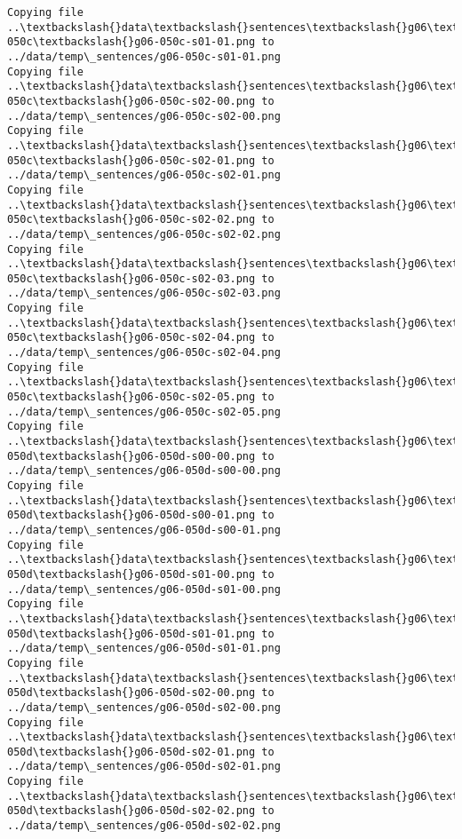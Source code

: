 \documentclass[11pt]{article}
\begin{document}
\begin{Verbatim}[commandchars=\\\{\}]
Copying file ..\textbackslash{}data\textbackslash{}sentences\textbackslash{}g06\textbackslash{}g06-050c\textbackslash{}g06-050c-s01-01.png to
../data/temp\_sentences/g06-050c-s01-01.png
Copying file ..\textbackslash{}data\textbackslash{}sentences\textbackslash{}g06\textbackslash{}g06-050c\textbackslash{}g06-050c-s02-00.png to
../data/temp\_sentences/g06-050c-s02-00.png
Copying file ..\textbackslash{}data\textbackslash{}sentences\textbackslash{}g06\textbackslash{}g06-050c\textbackslash{}g06-050c-s02-01.png to
../data/temp\_sentences/g06-050c-s02-01.png
Copying file ..\textbackslash{}data\textbackslash{}sentences\textbackslash{}g06\textbackslash{}g06-050c\textbackslash{}g06-050c-s02-02.png to
../data/temp\_sentences/g06-050c-s02-02.png
Copying file ..\textbackslash{}data\textbackslash{}sentences\textbackslash{}g06\textbackslash{}g06-050c\textbackslash{}g06-050c-s02-03.png to
../data/temp\_sentences/g06-050c-s02-03.png
Copying file ..\textbackslash{}data\textbackslash{}sentences\textbackslash{}g06\textbackslash{}g06-050c\textbackslash{}g06-050c-s02-04.png to
../data/temp\_sentences/g06-050c-s02-04.png
Copying file ..\textbackslash{}data\textbackslash{}sentences\textbackslash{}g06\textbackslash{}g06-050c\textbackslash{}g06-050c-s02-05.png to
../data/temp\_sentences/g06-050c-s02-05.png
Copying file ..\textbackslash{}data\textbackslash{}sentences\textbackslash{}g06\textbackslash{}g06-050d\textbackslash{}g06-050d-s00-00.png to
../data/temp\_sentences/g06-050d-s00-00.png
Copying file ..\textbackslash{}data\textbackslash{}sentences\textbackslash{}g06\textbackslash{}g06-050d\textbackslash{}g06-050d-s00-01.png to
../data/temp\_sentences/g06-050d-s00-01.png
Copying file ..\textbackslash{}data\textbackslash{}sentences\textbackslash{}g06\textbackslash{}g06-050d\textbackslash{}g06-050d-s01-00.png to
../data/temp\_sentences/g06-050d-s01-00.png
Copying file ..\textbackslash{}data\textbackslash{}sentences\textbackslash{}g06\textbackslash{}g06-050d\textbackslash{}g06-050d-s01-01.png to
../data/temp\_sentences/g06-050d-s01-01.png
Copying file ..\textbackslash{}data\textbackslash{}sentences\textbackslash{}g06\textbackslash{}g06-050d\textbackslash{}g06-050d-s02-00.png to
../data/temp\_sentences/g06-050d-s02-00.png
Copying file ..\textbackslash{}data\textbackslash{}sentences\textbackslash{}g06\textbackslash{}g06-050d\textbackslash{}g06-050d-s02-01.png to
../data/temp\_sentences/g06-050d-s02-01.png
Copying file ..\textbackslash{}data\textbackslash{}sentences\textbackslash{}g06\textbackslash{}g06-050d\textbackslash{}g06-050d-s02-02.png to
../data/temp\_sentences/g06-050d-s02-02.png

\end{Verbatim}
\end{document}
